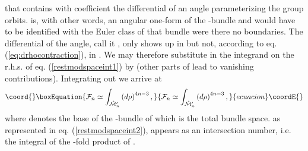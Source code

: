 \documentclass[a4paper,12pt]{article}
\begin{document}
that \myHighlight{$\rho$}\coordHE{} contains with coefficient \coordHE{} the differential of an 
angle parameterizing the \coordHE{} group orbits. \coordHE{} is, with other words, 
an angular one-form of the \coordHE{}-bundle and \coordHE{} 
would have to be identified with the Euler class of that bundle were there 
no boundaries. The differential of the \coordHE{} angle, call it \myHighlight{$\varphi$}\coordHE{}, 
only shows up in \myHighlight{$\rho$}\coordHE{} but not, according to eq. 
(\ref{eq:drhocontraction}), in \coordHE{}. We may therefore substitute
\myHighlight{$\rho$}\coordHE{} in the integrand on the r.h.s. of eq. 
(\ref{restmodspaceint1}) by \coordHE{} (other parts of \myHighlight{$\rho$}\coordHE{} lead to
vanishing contributions). Integrating out \myHighlight{$\varphi$}\coordHE{} we arrive at 
\begin{equation}\coord{}\boxEquation{
{\cal F}_n \simeq \int_{\hat{{\cal M}}'_n} \left(d\rho \right)^{4n-3}, 
\label{restmodspaceint2}
}{
{\cal F}_n \simeq \int_{\hat{{\cal M}}'_n} \left(d\rho \right)^{4n-3}, 
}{ecuacion}\coordE{}\end{equation}       
where \coordHE{} denotes the base 
of the \coordHE{}-bundle of which \coordHE{} is the total bundle 
space. \coordHE{} as represented in eq. (\ref{restmodspaceint2}), 
appears as an intersection number, i.e. the integral of the 
\coordHE{}-fold product of \coordHE{}.
\end{document}
